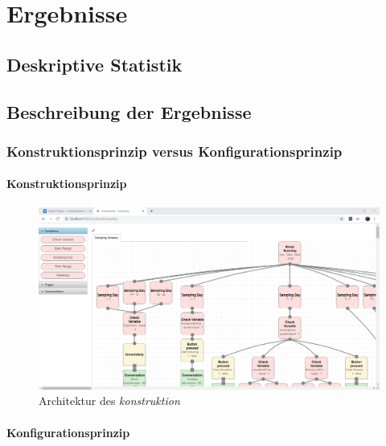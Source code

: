 
\chapter{Ergebnisse}
\label{ch:results}

\section{Deskriptive Statistik}

\section{Beschreibung der Ergebnisse}

\subsection{Konstruktionsprinzip versus Konfigurationsprinzip}

\subsubsection{Konstruktionsprinzip}
\begin{figure}[!h]
\centering
\includegraphics[width=1\textwidth]{pictures/konstruktion}
\caption{Architektur des \emph{konstruktion}}
\label{konstruktion}
\end{figure}

\subsubsection{Konfigurationsprinzip}

